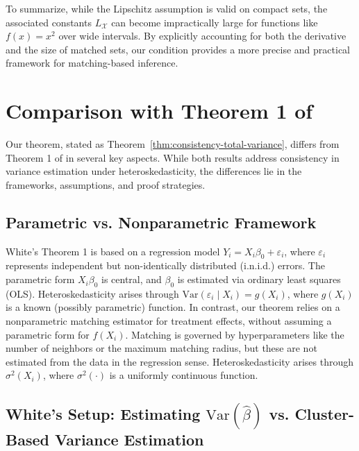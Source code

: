 \documentclass{mytemplate}
\begin{document}
To summarize, while the Lipschitz assumption is valid on compact sets, the associated constants $L_\mathcal{X}$ can become impractically large for functions like $f(x) = x^2$ over wide intervals. By explicitly accounting for both the derivative and the size of matched sets, our condition provides a more precise and practical framework for matching-based inference. 





\section{Comparison with Theorem 1 of \cite{white1980heteroskedasticity}}
\label{sec:comparison-to-white-HC}

Our theorem, stated as Theorem~\ref{thm:consistency-total-variance}, differs from Theorem 1 of \cite{white1980heteroskedasticity} in several key aspects. While both results address consistency in variance estimation under heteroskedasticity, the differences lie in the frameworks, assumptions, and proof strategies.

\subsection{Parametric vs. Nonparametric Framework}

White's Theorem 1 is based on a regression model \(Y_i = X_i \beta_0 + \varepsilon_i\), where \(\varepsilon_i\) represents independent but non-identically distributed (i.n.i.d.) errors. The parametric form \(X_i \beta_0\) is central, and \(\beta_0\) is estimated via ordinary least squares (OLS). Heteroskedasticity arises through \(\mathrm{Var}(\varepsilon_i \mid X_i) = g(X_i)\), where \(g(X_i)\) is a known (possibly parametric) function. In contrast, our theorem relies on a nonparametric matching estimator for treatment effects, without assuming a parametric form for \(f(X_i)\). Matching is governed by hyperparameters like the number of neighbors or the maximum matching radius, but these are not estimated from the data in the regression sense. Heteroskedasticity arises through \(\sigma^2(X_i)\), where \(\sigma^2(\cdot)\) is a uniformly continuous function.

\subsection{White's Setup: Estimating \(\mathrm{Var}(\hat{\beta})\) vs. Cluster-Based Variance Estimation}
\end{document}
